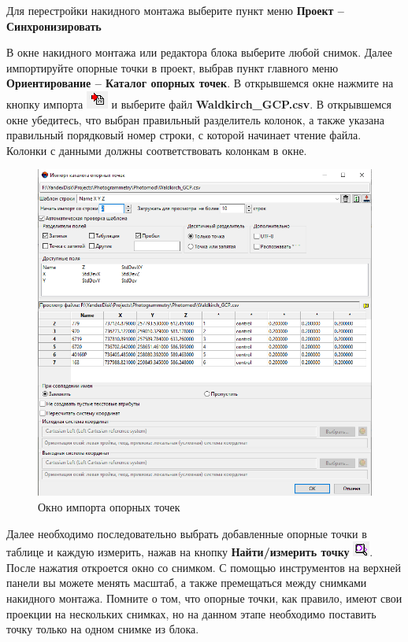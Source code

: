 \documentclass[
  12pt,
]{book}
\begin{document}
Для перестройки накидного монтажа выберите пункт меню \textbf{Проект -- Синхронизировать}

В окне накидного монтажа или редактора блока выберите любой снимок. Далее импортируйте опорные точки в проект, выбрав пункт главного меню \textbf{Ориентирование -- Каталог опорных точек}. В открывшемся окне нажмите на кнопку импорта \includegraphics{images/Ref15/Import_Points.png} и выберите файл \textbf{Waldkirch\_GCP.csv}. В открывшемся окне убедитесь, что выбран правильный разделитель колонок, а также указана правильный порядковый номер строки, с которой начинает чтение файла. Колонки с данными должны соответствовать колонкам в окне.

\begin{figure}
\centering
\includegraphics{images/Ref15/Import_Points2.png}
\caption{Окно импорта опорных точек}
\end{figure}

Далее необходимо последовательно выбрать добавленные опорные точки в таблице и каждую измерить, нажав на кнопку \textbf{Найти/измерить точку} \includegraphics{images/Ref15/Measure_Point.png}. После нажатия откроется окно со снимком. С помощью инструментов на верхней панели вы можете менять масштаб, а также премещаться между снимками накидного монтажа. Помните о том, что опорные точки, как правило, имеют свои проекции на нескольких снимках, но на данном этапе необходимо поставить точку только на одном снимке из блока.
\end{document}
